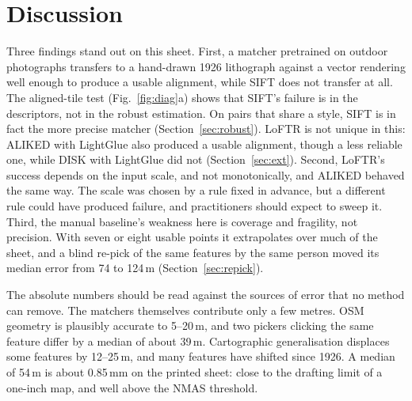 \documentclass[10pt,twocolumn]{article}
\newcommand{\metre}{\,m}
\begin{document}
\section{Discussion}
Three findings stand out on this sheet. First, a matcher pretrained on outdoor photographs transfers to a hand-drawn 1926 lithograph against a vector rendering well enough to produce a usable alignment, while SIFT does not transfer at all. The aligned-tile test (Fig.~\ref{fig:diag}a) shows that SIFT's failure is in the descriptors, not in the robust estimation. On pairs that share a style, SIFT is in fact the more precise matcher (Section~\ref{sec:robust}). LoFTR is not unique in this: ALIKED with LightGlue also produced a usable alignment, though a less reliable one, while DISK with LightGlue did not (Section~\ref{sec:ext}). Second, LoFTR's success depends on the input scale, and not monotonically, and ALIKED behaved the same way. The scale was chosen by a rule fixed in advance, but a different rule could have produced failure, and practitioners should expect to sweep it. Third, the manual baseline's weakness here is coverage and fragility, not precision. With seven or eight usable points it extrapolates over much of the sheet, and a blind re-pick of the same features by the same person moved its median error from 74 to 124\metre{} (Section~\ref{sec:repick}).

The absolute numbers should be read against the sources of error that no method can remove. The matchers themselves contribute only a few metres. OSM geometry is plausibly accurate to 5--20\metre, and two pickers clicking the same feature differ by a median of about 39\metre. Cartographic generalisation displaces some features by 12--25\metre, and many features have shifted since 1926. A median of 54\metre{} is about 0.85\,mm on the printed sheet: close to the drafting limit of a one-inch map, and well above the NMAS threshold.
\end{document}
